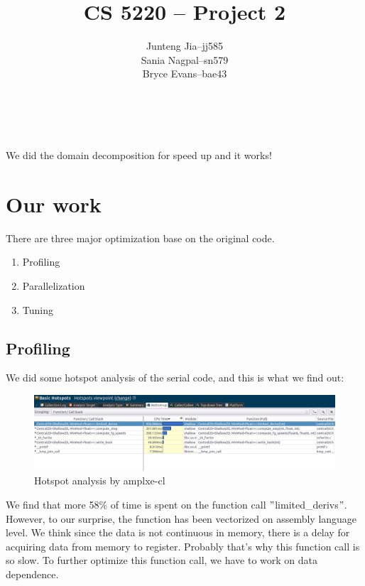 \documentclass[11pt]{article}
\title{CS 5220 -- Project 2} %
\author{
  \begin{tabular}{l c l}
    Junteng Jia  & -- & jj585 \\
    Sania Nagpal & -- & sn579 \\
    Bryce Evans  & -- & bae43 \\
  \end{tabular}\\
  \rule{\linewidth}{0.4pt}
}
\date{}
\begin{document}
    \thispagestyle{empty}
    \maketitle
    \begin{center}
    \end{center}
    \begin{center}
    We did the domain decomposition for speed up and it works!
    \end{center}

    \clearpage
    
    \section{Our work}
        There are three major optimization base on the original code.
        \begin{enumerate}
            \item Profiling
            \item Parallelization
            \item Tuning
        \end{enumerate}
    
        \vspace{0.3cm}
                

        \subsection{Profiling}
        We did some hotspot analysis of the serial code, and this is what we find out:
        \begin{figure}[H]
            \centering
            \includegraphics[width=4.5in]{hotspot.png}
            \caption{Hotspot analysis by amplxe-cl}
        \end{figure}
        
        We find that more 58\% of time is spent on the function call $"$limited\_derivs$"$. However, to our surprise, the function has been vectorized on assembly language level. We think since the data is not continuous in memory, there is a delay for acquiring data from memory to register. Probably that's why this function call is so slow. To further optimize this function call, we have to work on data dependence.
\end{document}
